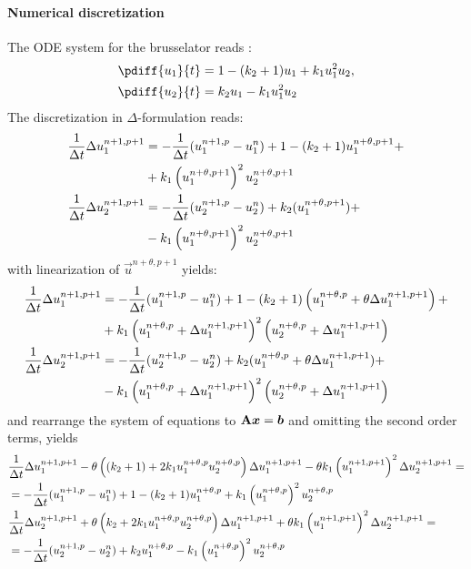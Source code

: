 \paragraph*{Numerical discretization}\label{sec:brusselator_discretization}

The  ODE system for the brusselator reads \citep[eq.\ 14,15]{AultHolmgreen2003}:
\begin{align}
    \pdiff{u_1}{t} & = 1 - (k_2 + 1) u_1 + k_1 u_1^2 u_2,
    \\
    \pdiff{u_2}{t} & = k_2 u_1 - k_1 u_1^2 u_2
\end{align}
The discretization in $\Delta$-formulation reads:
\begin{align}
    \frac{1}{\Delta t}\Delta u_1^{n+1, p+1} & = - \frac{1}{\Delta t}(u_1^{n+1,p} - u_1^n) + 1 - (k_2 +1) u_1^{n+\theta,p+1} +
    \nonumber \\*
    &  + k_1 \left(u_1^{n+\theta,p+1}\right)^2 u_2^{n+\theta,p+1}
    \\
    \frac{1}{\Delta t}\Delta u_2^{n+1, p+1} & = - \frac{1}{\Delta t}(u_2^{n+1,p} - u_2^n) + k_2(u_1^{n+\theta,p+1})  +
    \nonumber \\*
    & - k_1 \left(u_1^{n+\theta,p+1}\right)^2 u_2^{n+\theta,p+1}
\end{align}
with linearization of $\vec{u}^{n+\theta,p+1}$ yields:
\begin{align}
    \frac{1}{\Delta t}\Delta u_1^{n+1, p+1} & =
    - \frac{1}{\Delta t}(u_1^{n+1,p} - u_1^n) + 1 - (k_2 +1) \left(u_1^{n+\theta,p} + \theta \Delta u_1^{n+1, p+1}\right)+
    \nonumber \\*
    &  + k_1 \left(u_1^{n+\theta,p}+\Delta u_1^{n+1, p+1}\right)^2 \left(u_2^{n+\theta,p}+ \Delta u_1^{n+1, p+1}\right)
    \\
    \frac{1}{\Delta t}\Delta u_2^{n+1, p+1} & = - \frac{1}{\Delta t}(u_2^{n+1,p} - u_2^n) + k_2 (u_1^{n+\theta,p} + \theta \Delta u_1^{n+1, p+1}) +
    \nonumber \\*
    &
    - k_1 \left(u_1^{n+\theta,p}+\Delta u_1^{n+1, p+1}\right)^2 \left(u_2^{n+\theta,p}+ \Delta u_1^{n+1, p+1}\right)
\end{align}
and rearrange the system of equations to $\mbox{\boldmath ${\rm A}$}\mbox{\boldmath $x$}=\mbox{\boldmath $b$}$ and omitting the second order terms, yields
\begin{align}
    &\frac{1}{\Delta t}\Delta u_1^{n+1, p+1}
    - \theta \left(\left(k_2 +1\right) + 2  k_1 u_1^{n+\theta,p} u_2^{n+\theta,p}\right)\Delta u_1 ^{n+1, p+1}
    - \theta k_1 \left(u_1^{n+1, p+1}\right)^2 \Delta u_2 ^{n+1, p+1} =
    \nonumber \\*
    & = - \frac{1}{\Delta t}(u_1^{n+1,p} - u_1^n) + 1 - (k_2 +1) u_1^{n+\theta,p} + k_1 \left(u_1^{n+\theta,p}\right)^2 u_2^{n+\theta,p}
    \\
    & \frac{1}{\Delta t}\Delta u_2^{n+1, p+1}
    + \theta \left( k_2 + 2 k_1 u_1^{n+\theta,p} u_2^{n+\theta,p} \right) \Delta u_1 ^{n+1, p+1}
    + \theta k_1\left(u_1^{n+1, p+1}\right)^2 \Delta u_2 ^{n+1, p+1}
    = \nonumber \\*
    & =- \frac{1}{\Delta t}(u_2^{n+1,p} - u_2^n) + k_2 u_1^{n+\theta,p}
    - k_1 \left(u_1^{n+\theta,p}\right)^2 u_2^{n+\theta,p}
\end{align}
